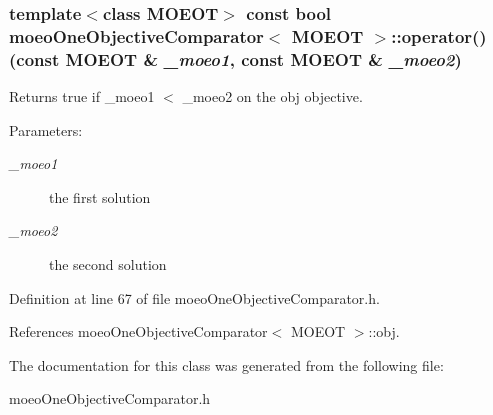\subsubsection{\setlength{\rightskip}{0pt plus 5cm}template$<$class MOEOT$>$ const bool \bf{moeo\-One\-Objective\-Comparator}$<$ MOEOT $>$::operator() (const MOEOT \& {\em \_\-moeo1}, const MOEOT \& {\em \_\-moeo2})\hspace{0.3cm}{\tt  [inline]}}\label{classmoeoOneObjectiveComparator_962a4cbc308c30a83c9c485a79374f6a}


Returns true if \_\-moeo1 $<$ \_\-moeo2 on the obj objective. 

\begin{Desc}
\item[Parameters:]
\begin{description}
\item[{\em \_\-moeo1}]the first solution \item[{\em \_\-moeo2}]the second solution \end{description}
\end{Desc}


Definition at line 67 of file moeo\-One\-Objective\-Comparator.h.

References moeo\-One\-Objective\-Comparator$<$ MOEOT $>$::obj.

The documentation for this class was generated from the following file:\begin{CompactItemize}
\item 
moeo\-One\-Objective\-Comparator.h\end{CompactItemize}
